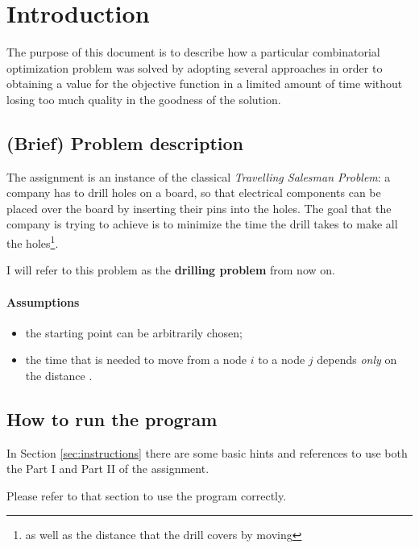 \section{Introduction}
The purpose of this document is to describe how a particular combinatorial
optimization problem was solved by adopting several approaches in order to
obtaining a value for the objective function in a limited amount of time without
losing too much quality in the goodness of the solution.

\subsection{(Brief) Problem description}
The assignment is an instance of the classical \textit{Travelling Salesman
Problem}: a company has to drill holes on a board, so that electrical components
can be placed over the board by inserting their pins into the holes. The goal
that the company is trying to achieve is to minimize the time the drill
takes to make all the holes\footnote{as well as the distance that the drill
covers by moving}.

I will refer to this problem as the \textbf{drilling problem} from now on.

\paragraph{Assumptions}
\begin{itemize}
  \item the starting point can be arbitrarily chosen;
  \item the time that is needed to move from a node $i$ to a node $j$ depends
    \textit{only} on the distance .
\end{itemize}

\subsection{How to run the program}

In Section \ref{sec:instructions} there are some basic hints and references
to use both the Part I and Part II of the assignment.

Please refer to that section to use the program correctly.
